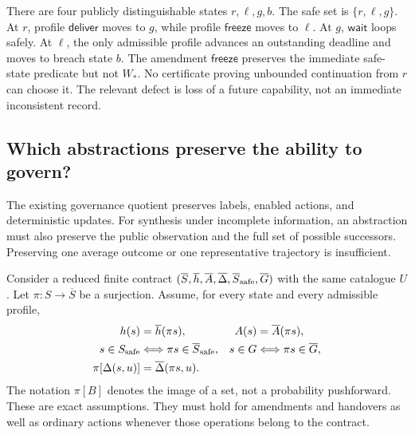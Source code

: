 \begin{MScounterexample}\label{MS:ex:amendment-dead-end}
There are four publicly distinguishable states $r,\ell,g,b$. The safe set is $\{r,\ell,g\}$. At $r$, profile $\mathsf{deliver}$ moves to $g$, while profile $\mathsf{freeze}$ moves to $\ell$. At $g$, $\mathsf{wait}$ loops safely. At $\ell$, the only admissible profile advances an outstanding deadline and moves to breach state $b$. The amendment $\mathsf{freeze}$ preserves the immediate safe-state predicate but not $W_*$. No certificate proving unbounded continuation from $r$ can choose it. The relevant defect is loss of a future capability, not an immediate inconsistent record.
\end{MScounterexample}

\subsection{Which abstractions preserve the ability to govern?}
The existing governance quotient preserves labels, enabled actions, and deterministic updates. For synthesis under incomplete information, an abstraction must also preserve the public observation and the full set of possible successors. Preserving one average outcome or one representative trajectory is insufficient.

Consider a reduced finite contract $(\overline S,\overline h,\overline A,\overline\Delta,\overline S_{\rm safe},\overline G)$ with the same catalogue $U$. Let $\pi:S\to\overline S$ be a surjection. Assume, for every state and every admissible profile,
\begin{align}
h(s)&=\overline h(\pi s), & A(s)&=\overline A(\pi s),\label{MS:eq:synthesis-labels}\\
s\in S_{\rm safe}&\Longleftrightarrow\pi s\in\overline S_{\rm safe}, &
s\in G&\Longleftrightarrow\pi s\in\overline G,\label{MS:eq:synthesis-goals}\\
\pi[\Delta(s,u)]&=\overline\Delta(\pi s,u).&&\label{MS:eq:synthesis-successors}
\end{align}
The notation $\pi[B]$ denotes the image of a set, not a probability pushforward. These are exact assumptions. They must hold for amendments and handovers as well as ordinary actions whenever those operations belong to the contract.

